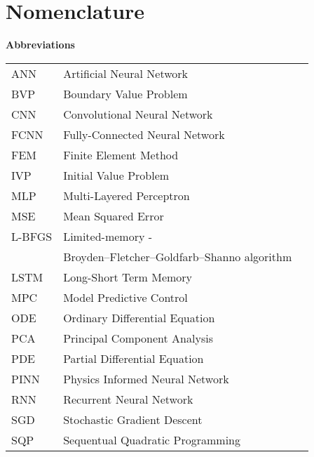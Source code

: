 \begin{minipage}{\textwidth}

\chapter*{Nomenclature}

\indent\textbf{\Large Abbreviations}

\vspace{1.0em}
{\renewcommand{\arraystretch}{1.4}
\begin{tabular}{p{}p{}p{}}


ANN     & Artificial Neural Network & \\
BVP     & Boundary Value Problem & \\
CNN     & Convolutional Neural Network & \\
FCNN    & Fully-Connected Neural Network & \\
FEM     & Finite Element Method & \\
IVP     & Initial Value Problem & \\
MLP     & Multi-Layered Perceptron & \\
MSE     & Mean Squared Error & \\
L-BFGS  & Limited-memory - & \\
        & Broyden–Fletcher–Goldfarb–Shanno algorithm & \\
LSTM    & Long-Short Term Memory & \\
MPC     & Model Predictive Control & \\
ODE     & Ordinary Differential Equation & \\
PCA     & Principal Component Analysis & \\
PDE     & Partial Differential Equation & \\
PINN    & Physics Informed Neural Network & \\
RNN     & Recurrent Neural Network & \\
SGD     & Stochastic Gradient Descent & \\
SQP     & Sequentual Quadratic Programming



\end{tabular}}
\end{minipage}
